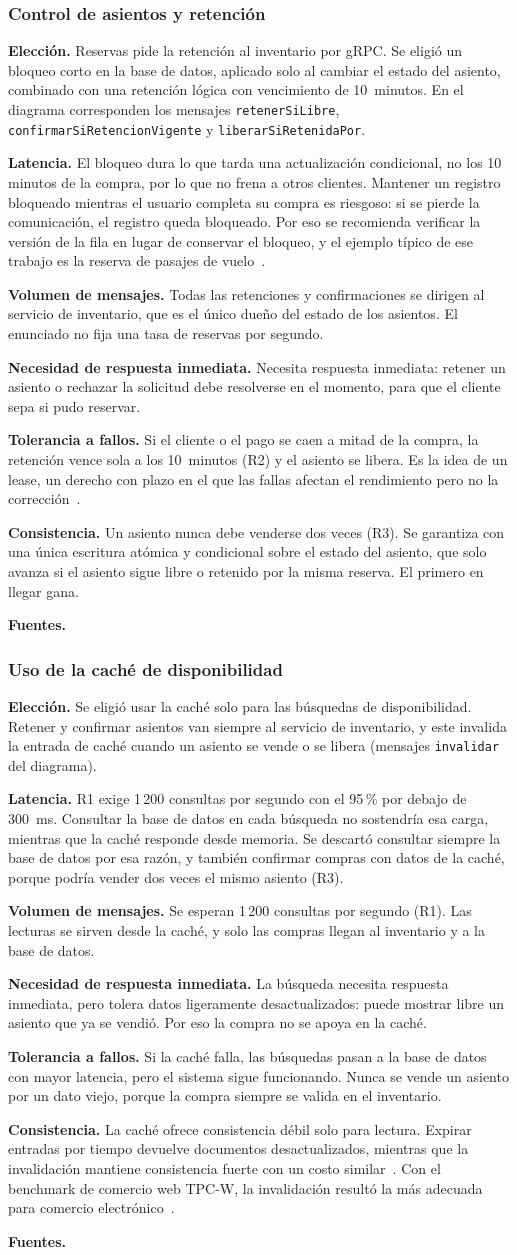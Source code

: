 \documentclass[11pt,a4paper]{article}
\newcommand{\decision}[8]{\subsubsection*{#1}%
  \textbf{Elección.} #2\par
  \textbf{Latencia.} #3\par
  \textbf{Volumen de mensajes.} #4\par
  \textbf{Necesidad de respuesta inmediata.} #5\par
  \textbf{Tolerancia a fallos.} #6\par
  \textbf{Consistencia.} #7\par
  \textbf{Fuentes.} #8\par}
\begin{document}
\decision{Control de asientos y retención}
 {Reservas pide la retención al inventario por gRPC. Se eligió un bloqueo corto en la base de datos, aplicado solo al cambiar el estado del asiento, combinado con una retención lógica con vencimiento de 10~minutos. En el diagrama corresponden los mensajes \texttt{retenerSiLibre}, \texttt{confirmarSiRetencionVigente} y \texttt{liberarSiRetenidaPor}.}
 {El bloqueo dura lo que tarda una actualización condicional, no los 10 minutos de la compra, por lo que no frena a otros clientes. Mantener un registro bloqueado mientras el usuario completa su compra es riesgoso: si se pierde la comunicación, el registro queda bloqueado. Por eso se recomienda verificar la versión de la fila en lugar de conservar el bloqueo, y el ejemplo típico de ese trabajo es la reserva de pasajes de vuelo~\cite{laux2009occ}.}
 {Todas las retenciones y confirmaciones se dirigen al servicio de inventario, que es el único dueño del estado de los asientos. El enunciado no fija una tasa de reservas por segundo.}
 {Necesita respuesta inmediata: retener un asiento o rechazar la solicitud debe resolverse en el momento, para que el cliente sepa si pudo reservar.}
 {Si el cliente o el pago se caen a mitad de la compra, la retención vence sola a los 10~minutos (R2) y el asiento se libera. Es la idea de un lease, un derecho con plazo en el que las fallas afectan el rendimiento pero no la corrección~\cite{gray1989leases}.}
 {Un asiento nunca debe venderse dos veces (R3). Se garantiza con una única escritura atómica y condicional sobre el estado del asiento, que solo avanza si el asiento sigue libre o retenido por la misma reserva. El primero en llegar gana.}
 {\cite{gray1989leases,laux2009occ}}
 
\decision{Uso de la caché de disponibilidad}
 {Se eligió usar la caché solo para las búsquedas de disponibilidad. Retener y confirmar asientos van siempre al servicio de inventario, y este invalida la entrada de caché cuando un asiento se vende o se libera (mensajes \texttt{invalidar} del diagrama).}
 {R1 exige 1\,200 consultas por segundo con el 95\,\% por debajo de 300~ms. Consultar la base de datos en cada búsqueda no sostendría esa carga, mientras que la caché responde desde memoria. Se descartó consultar siempre la base de datos por esa razón, y también confirmar compras con datos de la caché, porque podría vender dos veces el mismo asiento (R3).}
 {Se esperan 1\,200 consultas por segundo (R1). Las lecturas se sirven desde la caché, y solo las compras llegan al inventario y a la base de datos.}
 {La búsqueda necesita respuesta inmediata, pero tolera datos ligeramente desactualizados: puede mostrar libre un asiento que ya se vendió. Por eso la compra no se apoya en la caché.}
 {Si la caché falla, las búsquedas pasan a la base de datos con mayor latencia, pero el sistema sigue funcionando. Nunca se vende un asiento por un dato viejo, porque la compra siempre se valida en el inventario.}
 {La caché ofrece consistencia débil solo para lectura. Expirar entradas por tiempo devuelve documentos desactualizados, mientras que la invalidación mantiene consistencia fuerte con un costo similar~\cite{cao1998cache}. Con el benchmark de comercio web TPC-W, la invalidación resultó la más adecuada para comercio electrónico~\cite{cao2002strong}.}
 {\cite{cao1998cache,cao2002strong}}
 
\end{document}
